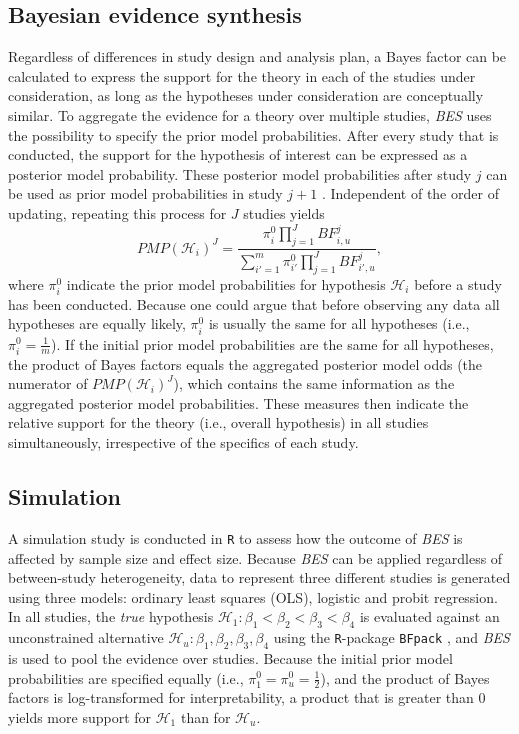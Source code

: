 \documentclass[]{interact}
\theoremstyle{plain}%
\theoremstyle{definition}
\theoremstyle{remark}
\begin{document}
\hypertarget{bayesian-evidence-synthesis}{%
\subsection{Bayesian evidence
synthesis}\label{bayesian-evidence-synthesis}}

Regardless of differences in study design and analysis plan, a Bayes
factor can be calculated to express the support for the theory in each
of the studies under consideration, as long as the hypotheses under
consideration are conceptually similar. To aggregate the evidence for a
theory over multiple studies, \emph{BES} uses the possibility to specify
the prior model probabilities. After every study that is conducted, the
support for the hypothesis of interest can be expressed as a posterior
model probability. These posterior model probabilities after study \(j\)
can be used as prior model probabilities in study \(j + 1\)
\citep{kuiper_combining_2013}. Independent of the order of updating,
repeating this process for \(J\) studies yields \[
PMP(\mathcal{H}_i)^J = \frac{\pi^0_{i} \prod^J_{j=1} BF^j_{i,u}}{\sum^m_{i'=1} \pi^0_{i'} \prod^J_{j=1} BF^j_{i',u}},
\] where \(\pi^0_i\) indicate the prior model probabilities for
hypothesis \(\mathcal{H}_i\) before a study has been conducted. Because
one could argue that before observing any data all hypotheses are
equally likely, \(\pi^0_i\) is usually the same for all hypotheses
(i.e., \(\pi^0_i = \frac{1}{m}\)). If the initial prior model
probabilities are the same for all hypotheses, the product of Bayes
factors equals the aggregated posterior model odds (the numerator of
\(PMP(\mathcal{H}_i)^J\)), which contains the same information as the
aggregated posterior model probabilities. These measures then indicate
the relative support for the theory (i.e., overall hypothesis) in all
studies simultaneously, irrespective of the specifics of each study.

\hypertarget{simulation}{%
\subsection{Simulation}\label{simulation}}

A simulation study is conducted in \texttt{R} \citep[Version 4.1.0]{R}
to assess how the outcome of \emph{BES} is affected by sample size and
effect size. Because \emph{BES} can be applied regardless of
between-study heterogeneity, data to represent three different studies
is generated using three models: ordinary least squares (OLS), logistic
and probit regression. In all studies, the \emph{true} hypothesis
\(\mathcal{H}_1: \beta_1 < \beta_2 < \beta_3 < \beta_4\) is evaluated
against an unconstrained alternative
\(\mathcal{H}_u: \beta_1, \beta_2, \beta_3, \beta_4\) using the
\texttt{R}-package \texttt{BFpack} \citep[Version 0.3.2]{BFpack}, and
\emph{BES} is used to pool the evidence over studies. Because the
initial prior model probabilities are specified equally (i.e.,
\(\pi^0_1 = \pi^0_u = \frac{1}{2}\)), and the product of Bayes factors
is log-transformed for interpretability, a product that is greater than
\(0\) yields more support for \(\mathcal{H}_1\) than for
\(\mathcal{H}_u\).
\end{document}
